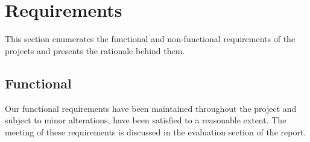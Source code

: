 \section{Requirements}
\label{spec:requirements}
This section enumerates the functional and non-functional requirements of the projects and presents the rationale behind them.\\


\subsection{Functional}
\label{spec:functional}

Our functional requirements have been maintained throughout the project and subject to minor alterations, have been satisfied to a reasonable extent. The meeting of these requirements is discussed in the evaluation section of the report.


